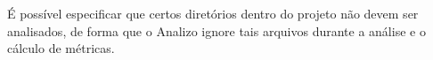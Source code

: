\begin{itemize}
\begin{itemize}
\end{itemize}

É possível especificar que certos diretórios dentro do projeto não devem ser
analisados, de forma que o Analizo ignore tais arquivos durante a análise e o
cálculo de métricas.

%


%

%
%


\end{itemize}
